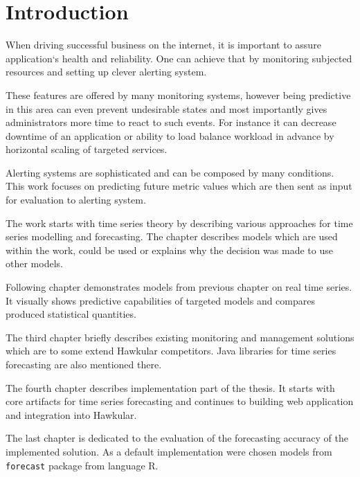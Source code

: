 
%
%
%
\chapter{Introduction} \label{chap:introduction}
When driving successful business on the internet, it is important to assure application`s health and reliability. One
can achieve that by monitoring subjected resources and setting up clever alerting system.

These features are offered by many monitoring systems, however being predictive in this area can even prevent
undesirable states and most importantly gives administrators more time to react to such events. For instance it
can decrease downtime of an application or ability to load balance workload in advance by horizontal scaling of
targeted services.

Alerting systems are sophisticated and can be composed by many conditions. This work focuses on predicting future
metric values which are then sent as input for evaluation to alerting system.

The work starts with time series theory by describing various approaches for time series modelling and forecasting.
The chapter describes models which are used within the work, could be used or explains why the decision was made to
use other models.

Following chapter demonstrates models from previous chapter on real time series. It visually shows predictive
capabilities of targeted models and compares produced statistical quantities.

The third chapter briefly describes existing monitoring and management solutions which are to some extend
Hawkular competitors. Java libraries for time series forecasting are also mentioned there.

The fourth chapter describes implementation part of the thesis. It starts with core artifacts for time series
forecasting and continues to building web application and integration into Hawkular.

The last chapter is dedicated to the evaluation of the forecasting accuracy of the implemented solution. As a default
implementation were chosen models from \texttt{forecast} package from language R.

